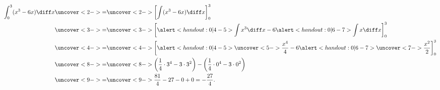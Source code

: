 \begin{frame}
\begin{example}[Example 4, p. 359]
\abovedisplayskip=0pt
\belowdisplayskip=0pt
\abovedisplayshortskip=0pt
\belowdisplayshortskip=0pt
\begin{align*}
\int_0^3 (x^3 - 6x)\diff x %
& \uncover<2->{=}  \uncover<2->{\left[ \int (x^3 - 6x)\diff x  \right]_0^3}\\%
& \uncover<3->{=}  \uncover<3->{\left[ \alert<handout:0| 4-5>{\int x^3 \diff x} - 6\alert<handout:0| 6-7>{\int x \diff x}  \right]_0^3}\\%
& \uncover<4->{=}  \uncover<4->{\left[ \alert<handout:0| 4-5>{\uncover<5->{\frac{x^4}{4}}} - 6\alert<handout:0| 6-7>{\uncover<7->{\frac{x^2}{2}}}  \right]_0^3}\\%
& \uncover<8->{=}  \uncover<8->{ \left( \frac{1}{4} \cdot 3^4 - 3\cdot 3^2 \right) - \left( \frac{1}{4}\cdot 0^4 - 3\cdot 0^2  \right) }\\%
& \uncover<9->{=}  \uncover<9->{ \frac{81}{4} - 27 - 0 + 0 = -\frac{27}{4}}.
\end{align*}
\end{example}
\end{frame}
